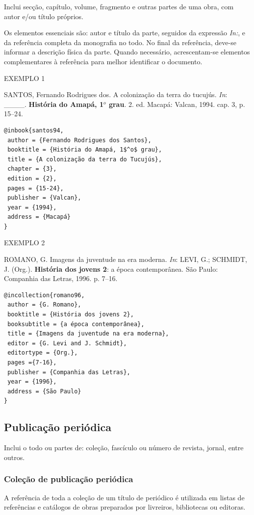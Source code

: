 Inclui secção, capítulo, volume, fragmento e outras partes de uma obra, com autor e/ou título próprios.

Os elementos essenciais são: autor e título da parte, seguidos da expressão \textit{In:}, e da referência completa da monografia no todo. No final da referência, deve-se informar a descrição física da parte. Quando necessário, acrescentam-se elementos complementares à referência para melhor identificar o documento.

EXEMPLO 1 

SANTOS, Fernando Rodrigues dos. A colonização da terra do tucujús. \textit{In}: \_\_\_\_. \textbf{História do Amapá, 1$^o$ grau}. 2. ed. Macapá: Valcan, 1994. cap. 3, p. 15–24.

\begin{verbatim}
@inbook{santos94,
 author = {Fernando Rodrigues dos Santos},
 booktitle = {História do Amapá, 1$^o$ grau},
 title = {A colonização da terra do Tucujús},
 chapter = {3},
 edition = {2},
 pages = {15-24},
 publisher = {Valcan},
 year = {1994},
 address = {Macapá}
}
\end{verbatim}

EXEMPLO 2 

ROMANO, G. Imagens da juventude na era moderna. \textit{In}: LEVI, G.; SCHMIDT, J. (Org.). \textbf{História dos jovens 2}: a época contemporânea. São Paulo: Companhia das Letras, 1996. p. 7–16.

\begin{verbatim}
@incollection{romano96,
 author = {G. Romano},
 booktitle = {História dos jovens 2},
 booksubtitle = {a época contemporânea},
 title = {Imagens da juventude na era moderna},
 editor = {G. Levi and J. Schmidt},
 editortype = {Org.},
 pages ={7-16},
 publisher = {Companhia das Letras},
 year = {1996},
 address = {São Paulo}
}
\end{verbatim}

\subsection{Publicação periódica}

Inclui o todo ou partes de: coleção, fascículo ou número de revista, jornal, entre outros.

\subsubsection{Coleção de publicação periódica}

A referência de toda a coleção de um título de periódico é utilizada em listas de referências e catálogos de obras preparados por livreiros, bibliotecas ou editoras.

